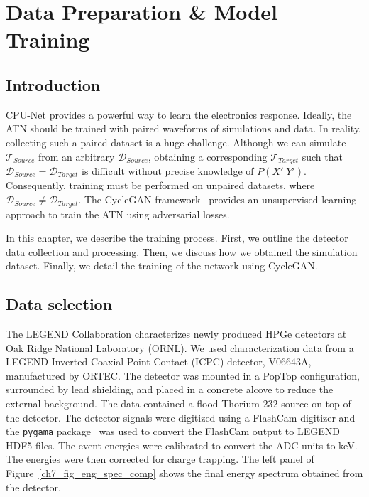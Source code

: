 \chapter{Data Preparation \& Model Training} \label{chap:training}

\section{Introduction}
CPU-Net provides a powerful way to learn the electronics response. Ideally, the ATN should be trained with paired waveforms of simulations and data. In reality, collecting such a paired dataset is a huge challenge. Although we can simulate $\mathcal{T}_{Source}$ from an arbitrary $\mathcal{D}_{Source}$, obtaining a corresponding $\mathcal{T}_{Target}$ such that $\mathcal{D}_{Source} = \mathcal{D}_{Target}$ is difficult without precise knowledge of $P(X'|Y')$. Consequently, training must be performed on unpaired datasets, where $\mathcal{D}_{Source} \neq \mathcal{D}_{Target}$. The CycleGAN framework~\cite{CycleGAN} provides an unsupervised learning approach to train the ATN using adversarial losses.

In this chapter, we describe the training process. First, we outline the detector data collection and processing. Then, we discuss how we obtained the simulation dataset. Finally, we detail the training of the network using CycleGAN.

\section{Data selection}

The LEGEND Collaboration characterizes newly produced HPGe detectors at Oak Ridge National Laboratory (ORNL). We used characterization data from a LEGEND Inverted-Coaxial Point-Contact (ICPC) detector, V06643A, manufactured by ORTEC. The detector was mounted in a PopTop configuration, surrounded by lead shielding, and placed in a concrete alcove to reduce the external background. The data contained a flood Thorium-232 source on top of the detector. The detector signals were digitized using a FlashCam digitizer and the \texttt{pygama} package~\cite{pygama} was used to convert the FlashCam output to LEGEND HDF5 files.  The event energies were calibrated to convert the ADC units to keV. The energies were then corrected for charge trapping. The left panel of Figure~\ref{ch7_fig_eng_spec_comp} shows the final energy spectrum obtained from the detector.


